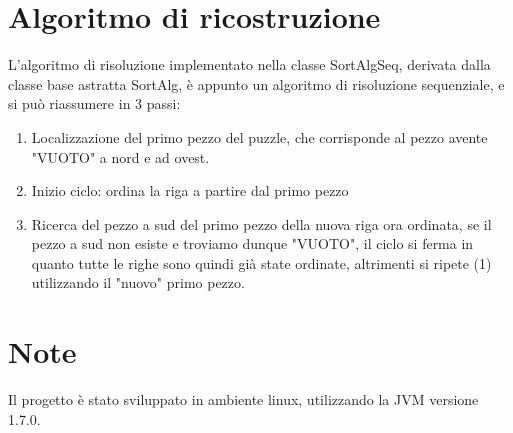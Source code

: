\documentclass[11pt,a4paper]{article}
\begin{document}
\section{Algoritmo di ricostruzione}
\label{sec-2}
L'algoritmo di risoluzione implementato nella classe SortAlgSeq, derivata dalla classe base astratta SortAlg, è appunto un algoritmo di risoluzione 
sequenziale, e si può riassumere in 3 passi:
\begin{enumerate}
\item Localizzazione del primo pezzo del puzzle, che corrisponde al pezzo avente "VUOTO" a nord e ad ovest.
\item Inizio ciclo: ordina la riga a partire dal primo pezzo
\item Ricerca del pezzo a sud del primo pezzo della nuova riga ora ordinata, se il pezzo a sud non esiste e troviamo dunque "VUOTO", il ciclo si ferma 
in quanto tutte le righe sono quindi già state ordinate, altrimenti si ripete (1) utilizzando il "nuovo" primo pezzo.
\end{enumerate}
\section{Note}
\label{sec-3}
Il progetto è stato sviluppato in ambiente linux, utilizzando la JVM versione 1.7.0.
\end{document}
